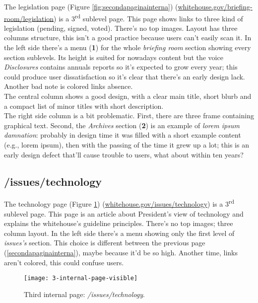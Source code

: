 \documentclass[
10pt, %
a4paper, %
oneside, %
headinclude,footinclude, %
BCOR5mm, %
]{scrartcl}
\begin{document}
	
	The legislation page (Figure \ref{fig:secondapaginainterna}) (\href{http://www.whitehouse.gov/briefing-room/legislation}{whitehouse.gov/briefing-room/legislation}) is a 3\textsuperscript{rd} sublevel page. This page shows links to three kind of legislation (pending, signed, voted). There's no top images. Layout has three columns structure, this isn't a good practice because users can't easily scan it. In the left side there's a menu (\textbf{1}) for the whole \emph{briefing room} section showing every section sublevels. Its height is suited for nowadays content but the voice \emph{Disclosures} contains annuals reports so it's expected to grow every year; this could produce user dissatisfaction so it's clear that there's an early design lack. Another bad note is colored links absence. \\
	The central column shows a good design, with a clear main title, short blurb and a compact list of minor titles with short description. \\
	The right side column is a bit problematic. First, there are three frame containing graphical text. Second, the \emph{Archives} section (\textbf{2}) is an example of \emph{lorem ipsum damnation}: probably in design time it was filled with a short example content (e.g., lorem ipsum), then with the passing of the time it grew up a lot; this is an early design defect that'll cause trouble to users, what about within ten years?
	

	\subsection{/issues/technology}
	\label{terzapaginainterna} 

	
	The technology page (Figure \ref{fig:terzapaginainterna}) (\href{http://www.whitehouse.gov/issues/technology}{whitehouse.gov/issues/technology}) is a 3\textsuperscript{rd} sublevel page. This page is an article about President's view of technology and explains the whitehouse's guideline principles. There's no top images; three column layout. In the left side there's a menu showing only the first level of \emph{issues's} section. This choice is different between the previous page (\ref{secondapaginainterna}), maybe because it'd be so high. Another time, links aren't colored, this could confuse users. \\

	\begin{figure}[h!]
	\centering 
	\centerline{\texttt{[image: 3-internal-page-visible]}}
	\caption[Third internal page: /issues/technology]{Third internal page: \emph{/issues/technology}.}
	\label{fig:terzapaginainterna} 
	\end{figure}
\end{document}
